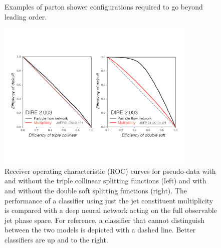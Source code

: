 \begin{figure}[h!]
{\label{fig:jets:np:triplecollineardiagrams6}
}
\caption{Examples of parton shower configurations required to go beyond leading order.}
\label{fig:jets:np:triplecollineardiagrams}
\end{figure}

\begin{figure}[h!]
\centering
\includegraphics[width=0.85\textwidth]{figs/triplecollinear.pdf}
\caption{Receiver operating characteristic (ROC) curves for pseudo-data with and without the triple collinear splitting functions (left) and with and without the double soft splitting functions (right).  The performance of a classifier using just the jet constituent multiplicity is compared with a deep neural network acting on the full observable jet phase space.  For reference, a classifier that cannot distinguish between the two models is depicted with a dashed line.  Better classifiers are up and to the right.}
\label{fig:jets:np:triplecollinearNN}
\end{figure}




